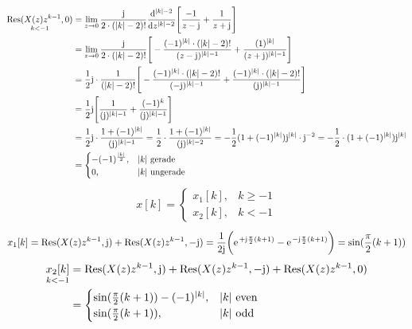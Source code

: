 \documentclass[11pt,a4paper,DIV=12]{scrartcl}
\begin{document}
\begin{align}
	\underset{k<-1}{\mathrm{Res}(X(z)z^{k-1},0)}&=\lim\limits_{z\rightarrow0}\frac{\im}{2\cdot(|k|-2)!}\frac{\mathrm{d}^{|k|-2}}{\mathrm{d}z^{|k|-2}}\Bigg [\frac{-1}{z-\im}+\frac{1}{z+\im} \Bigg ] \nonumber \\
	&=\lim\limits_{z\rightarrow0}\frac{\im}{2\cdot(|k|-2)!}\Bigg [-\frac{(-1)^{|k|}\cdot(|k|-2)!}{(z-\im)^{|k|-1}}+\frac{(1)^{|k|}}{(z+\im)^{|k|-1}} \Bigg]\nonumber\\
	&=\frac{1}{2}\im \cdot\frac{1}{(|k|-2)!}\Bigg [-\frac{(-1)^{|k|}\cdot(|k|-2)!}{(-\im)^{|k|-1}}+\frac{(-1)^{|k|}\cdot(|k|-2)!}{(\im)^{|k|-1}}\Bigg] \nonumber \\
	&=\frac{1}{2}\im\Bigg[\frac{1}{(\im)^{|k|-1}}+\frac{(-1)^{k}}{(\im)^{|k|-1}}\Bigg ] \nonumber \\
	&=\frac{1}{2}\im\cdot\frac{1+(-1)^{|k|}}{(\im)^{|k|-1}}=\frac{1}{2}\cdot\frac{1+(-1)^{|k|}}{(\im)^{|k|-2}}=-\frac{1}{2}(1+(-1)^{|k|})\im^{|k|}\cdot\im^{-2}=-\frac{1}{2}\cdot(1+(-1)^{|k|})\im^{|k|} \nonumber \\
	&=\begin{cases}
		-(-1)^{\frac{|k|}{2}}, &|k|\text{ gerade} \\
		0, &|k|\text{ ungerade}
	\end{cases}
\end{align}
\begin{align}
	x[k]=\begin{cases}
		x_1[k], &k\geq -1 \\
		x_2[k], &k< -1
	\end{cases}
\end{align}
\begin{align}
	x_1[k]=\mathrm{Res}(X(z)z^{k-1},\im)+\mathrm{Res}(X(z)z^{k-1},-\im)=\frac{1}{2\im}\bigg(\e^{+\im\frac{\pi}{2}(k+1)}-\e^{-\im\frac{\pi}{2}(k+1)}\bigg )=\sin(\frac{\pi}{2}(k+1))
\end{align}
\begin{align}
	\underset{k<-1}{x_2[k]}&=\mathrm{Res}(X(z)z^{k-1},\im)+\mathrm{Res}(X(z)z^{k-1},-\im)+\mathrm{Res}(X(z)z^{k-1},0) \nonumber \\
	&=\begin{cases}
		\sin(\frac{\pi}{2}(k+1))-(-1)^{|k|}, &|k| \text{ even} \\
		\sin(\frac{\pi}{2}(k+1)), &|k| \text{ odd}
	\end{cases}
\end{align}
\end{document}
